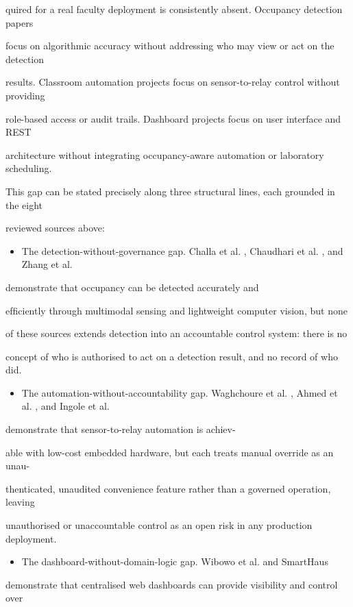 quired for a real faculty deployment is consistently absent. Occupancy detection papers

focus on algorithmic accuracy without addressing who may view or act on the detection

results. Classroom automation projects focus on sensor-to-relay control without providing

role-based access or audit trails. Dashboard projects focus on user interface and REST

architecture without integrating occupancy-aware automation or laboratory scheduling.

This gap can be stated precisely along three structural lines, each grounded in the eight

reviewed sources above:

\begin{itemize}
	\item The detection-without-governance gap. Challa et al. \cite{challa2025}, Chaudhari et al. \cite{chaudhari2024}, and Zhang et al. \cite{zhang2026}\end{itemize}demonstrate that occupancy can be detected accurately and

efﬁciently through multimodal sensing and lightweight computer vision, but none

of these sources extends detection into an accountable control system: there is no

concept of who is authorised to act on a detection result, and no record of who did.

\begin{itemize}
	\item The automation-without-accountability gap. Waghchoure et al. \cite{waghchoure2025}, Ahmed et al. \cite{ahmed2020}, and Ingole et al. \cite{ingole2024}\end{itemize}demonstrate that sensor-to-relay automation is achiev-

able with low-cost embedded hardware, but each treats manual override as an unau-

thenticated, unaudited convenience feature rather than a governed operation, leaving

unauthorised or unaccountable control as an open risk in any production deployment.

\begin{itemize}
	\item The dashboard-without-domain-logic gap. Wibowo et al. \cite{wibowo2023} and SmartHaus \cite{smarthaus}
\end{itemize}
demonstrate that centralised web dashboards can provide visibility and control over

